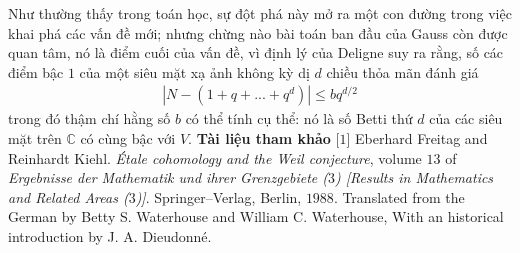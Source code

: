 \begin{multicols}{2}
	\vskip 0.1cm
	Như thường thấy trong toán học, sự đột phá này mở ra một con đường trong việc khai phá các vấn đề mới; nhưng chừng nào bài toán ban đầu của Gauss còn được quan tâm, nó là điểm cuối của vấn đề, vì định lý của Deligne suy ra rằng, số các điểm bậc $1$ của một siêu mặt xạ ảnh không kỳ dị $d$ chiều thỏa mãn đánh giá
	\begin{align*} 
		\left| N - (1 + q+...+q^d )\right| \leq bq^{d/2}
	\end{align*}
	trong đó thậm chí hằng số $b$ có thể tính cụ thể: nó là số Betti thứ $d$ của các siêu mặt trên $\mathbb{C}$ có cùng bậc với $V$.
	\vskip 0.1cm
	\textbf{\color{duongvaotoanhoc}Tài liệu tham khảo}
	\vskip 0.1cm
	[$1$] Eberhard Freitag and Reinhardt Kiehl. \textit{Étale cohomology and the Weil conjecture}, volume $13$ of \textit{Ergebnisse der Mathematik und ihrer Grenzgebiete ($3$) [Results in Mathematics and Related
	Areas ($3$)]}. Springer--Verlag, Berlin, $1988$. Translated from the German by Betty S. Waterhouse and William C. Waterhouse, With an historical introduction by J. A. Dieudonné.
\end{multicols}